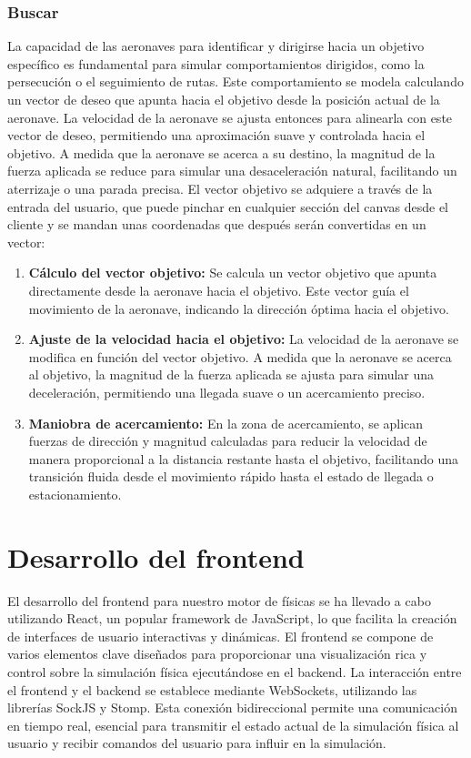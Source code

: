 \subsubsection{Buscar}
La capacidad de las aeronaves para identificar y dirigirse hacia un objetivo específico es fundamental para simular comportamientos dirigidos, como la persecución o el seguimiento de rutas. Este comportamiento se modela calculando un vector de deseo que apunta hacia el objetivo desde la posición actual de la aeronave. La velocidad de la aeronave se ajusta entonces para alinearla con este vector de deseo, permitiendo una aproximación suave y controlada hacia el objetivo. A medida que la aeronave se acerca a su destino, la magnitud de la fuerza aplicada se reduce para simular una desaceleración natural, facilitando un aterrizaje o una parada precisa.
El vector objetivo se adquiere a través de la entrada del usuario, que puede pinchar en cualquier sección del canvas desde el cliente y se mandan unas coordenadas que después serán convertidas en un vector:
\begin{enumerate}
    \item \textbf{Cálculo del vector objetivo:} Se calcula un vector objetivo que apunta directamente desde la aeronave hacia el objetivo. Este vector guía el movimiento de la aeronave, indicando la dirección óptima hacia el objetivo.
    \item \textbf{Ajuste de la velocidad hacia el objetivo:} La velocidad de la aeronave se modifica en función del vector objetivo. A medida que la aeronave se acerca al objetivo, la magnitud de la fuerza aplicada se ajusta para simular una deceleración, permitiendo una llegada suave o un acercamiento preciso.
    \item \textbf{Maniobra de acercamiento:} En la zona de acercamiento, se aplican fuerzas de dirección y magnitud calculadas para reducir la velocidad de manera proporcional a la distancia restante hasta el objetivo, facilitando una transición fluida desde el movimiento rápido hasta el estado de llegada o estacionamiento.
\end{enumerate}
\section{Desarrollo del frontend}
El desarrollo del frontend para nuestro motor de físicas se ha llevado a cabo utilizando React, un popular framework de JavaScript, lo que facilita la creación de interfaces de usuario interactivas y dinámicas. El frontend se compone de varios elementos clave diseñados para proporcionar una visualización rica y control sobre la simulación física ejecutándose en el backend.
La interacción entre el frontend y el backend se establece mediante WebSockets, utilizando las librerías SockJS y Stomp. Esta conexión bidireccional permite una comunicación en tiempo real, esencial para transmitir el estado actual de la simulación física al usuario y recibir comandos del usuario para influir en la simulación.
